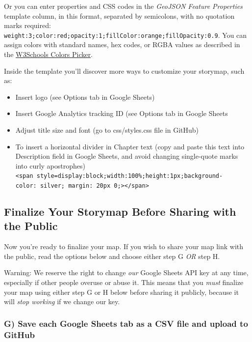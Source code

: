 \documentclass[
  english,
]{book}
\providecommand{\tightlist}{%
  \setlength{\itemsep}{0pt}\setlength{\parskip}{0pt}}
\begin{document}
Or you can enter properties and CSS codes in the \emph{GeoJSON Feature Properties} template column, in this format, separated by semicolons, with no quotation marks required: \texttt{weight:3;color:red;opacity:1;fillColor:orange;fillOpacity:0.9}. You can assign colors with standard names, hex codes, or RGBA values as described in the \href{https://www.w3schools.com/colors/colors_picker.asp}{W3Schools Colors Picker}.

Inside the template you'll discover more ways to customize your storymap, such as:

\begin{itemize}
\tightlist
\item
  Insert logo (see Options tab in Google Sheets)
\item
  Insert Google Analytics tracking ID (see Options tab in Google Sheets
\item
  Adjust title size and font (go to css/styles.css file in GitHub)
\item
  To insert a horizontal divider in Chapter text (copy and paste this text into Description field in Google Sheets, and avoid changing single-quote marks into curly apostrophes)
  \texttt{\textless{}span\ style=\textquotesingle{}display:block;width:100\%;height:1px;background-color:\ silver;\ margin:\ 20px\ 0;\textquotesingle{}\textgreater{}\textless{}/span\textgreater{}}
\end{itemize}

\hypertarget{finalize-your-storymap-before-sharing-with-the-public}{%
\subsection*{Finalize Your Storymap Before Sharing with the Public}\label{finalize-your-storymap-before-sharing-with-the-public}}

Now you're ready to finalize your map. If you wish to share your map link with the public, read the options below and choose either step G \emph{OR} step H.

Warning: We reserve the right to change \emph{our} Google Sheets API key at any time, especially if other people overuse or abuse it. This means that you \emph{must} finalize your map using either step G or H below before sharing it publicly, because it will \emph{stop working} if we change our key.

\hypertarget{g-save-each-google-sheets-tab-as-a-csv-file-and-upload-to-github-1}{%
\subsubsection*{G) Save each Google Sheets tab as a CSV file and upload to GitHub}\label{g-save-each-google-sheets-tab-as-a-csv-file-and-upload-to-github-1}}
\end{document}
